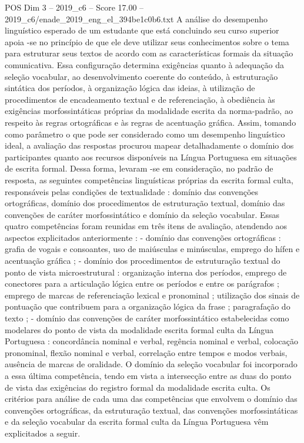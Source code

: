 \begin{textsample}{POS Dim 3 – 2019\_c6 – Score 17.00 – 2019\_c6/enade\_2019\_eng\_el\_394be1c0b6.txt}
A análise do desempenho linguístico esperado de um estudante que está concluindo seu curso superior apoia -se no princípio de que ele deve utilizar seus conhecimentos sobre o tema para estruturar seus textos de acordo com as características formais da situação comunicativa.
Essa configuração determina exigências quanto à adequação da seleção vocabular, ao desenvolvimento coerente do conteúdo, à estruturação sintática dos períodos, à organização lógica das ideias, à utilização de procedimentos de encadeamento textual e de referenciação, à obediência às exigências morfossintáticas próprias da modalidade escrita da norma-padrão, ao respeito às regras ortográficas e às regras de acentuação gráfica.
Assim, tomando como parâmetro o que pode ser considerado como um desempenho linguístico ideal, a avaliação das respostas procurou mapear detalhadamente o domínio dos participantes quanto aos recursos disponíveis na Língua Portuguesa em situações de escrita formal.
Dessa forma, levaram -se em consideração, no padrão de resposta, as seguintes competências linguísticas próprias da escrita formal culta, responsáveis pelas condições de textualidade : domínio das convenções ortográficas, domínio dos procedimentos de estruturação textual, domínio das convenções de caráter morfossintático e domínio da seleção vocabular.
Essas quatro competências foram reunidas em três itens de avaliação, atendendo aos aspectos explicitados anteriormente : - domínio das convenções ortográficas : grafia de vogais e consoantes, uso de maiúsculas e minúsculas, emprego do hífen e acentuação gráfica ; - domínio dos procedimentos de estruturação textual do ponto de vista microestrutural : organização interna dos períodos, emprego de conectores para a articulação lógica entre os períodos e entre os parágrafos ; emprego de marcas de referenciação lexical e pronominal ; utilização dos sinais de pontuação que contribuem para a organização lógica da frase ; paragrafação do texto ; - domínio das convenções de caráter morfossintático estabelecidas como modelares do ponto de vista da modalidade escrita formal culta da Língua Portuguesa : concordância nominal e verbal, regência nominal e verbal, colocação pronominal, flexão nominal e verbal, correlação entre tempos e modos verbais, ausência de marcas de oralidade.
O domínio da seleção vocabular foi incorporado a essa última competência, tendo em vista a intersecção entre as duas do ponto de vista das exigências do registro formal da modalidade escrita culta.
Os critérios para análise de cada uma das competências que envolvem o domínio das convenções ortográficas, da estruturação textual, das convenções morfossintáticas e da seleção vocabular da escrita formal culta da Língua Portuguesa vêm explicitados a seguir.

\end{textsample}
